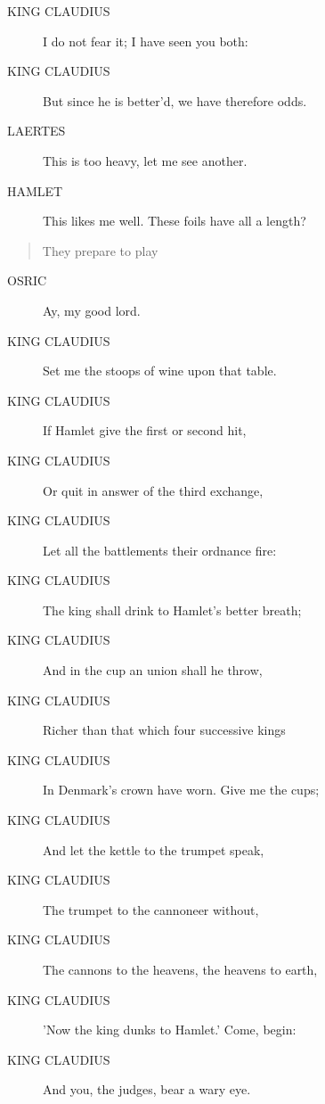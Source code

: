 \documentclass{article}
\begin{document}
\begin{description}
            
\item[KING CLAUDIUS] I do not fear it; I have seen you both:
\item[KING CLAUDIUS] But since he is better'd, we have therefore odds.
\end{description}
          
\begin{description}
            
\item[LAERTES] This is too heavy, let me see another.
\end{description}
          
\begin{description}
            
\item[HAMLET] This likes me well. These foils have all a length?
\end{description}
          
\begin{quote}
They prepare to play
\end{quote}
          
\begin{description}
            
\item[OSRIC] Ay, my good lord.
\end{description}
          
\begin{description}
            
\item[KING CLAUDIUS] Set me the stoops of wine upon that table.
\item[KING CLAUDIUS] If Hamlet give the first or second hit,
\item[KING CLAUDIUS] Or quit in answer of the third exchange,
\item[KING CLAUDIUS] Let all the battlements their ordnance fire:
\item[KING CLAUDIUS] The king shall drink to Hamlet's better breath;
\item[KING CLAUDIUS] And in the cup an union shall he throw,
\item[KING CLAUDIUS] Richer than that which four successive kings
\item[KING CLAUDIUS] In Denmark's crown have worn. Give me the cups;
\item[KING CLAUDIUS] And let the kettle to the trumpet speak,
\item[KING CLAUDIUS] The trumpet to the cannoneer without,
\item[KING CLAUDIUS] The cannons to the heavens, the heavens to earth,
\item[KING CLAUDIUS] 'Now the king dunks to Hamlet.' Come, begin:
\item[KING CLAUDIUS] And you, the judges, bear a wary eye.
\end{description}
          
\end{document}
